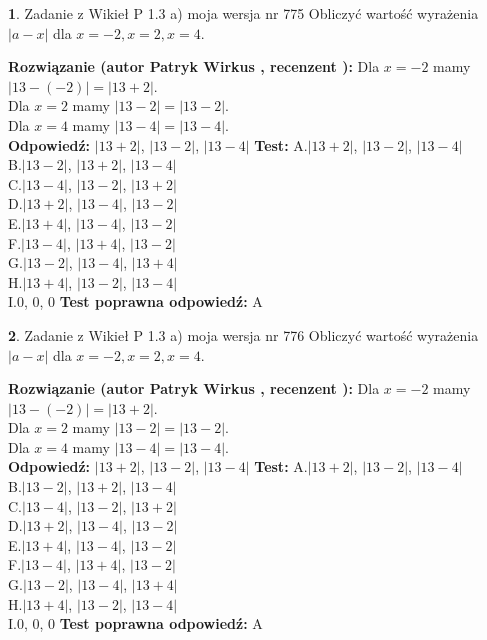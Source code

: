 \documentclass[12pt, a4paper]{article}
\theoremstyle{definition} %
\newtheorem{zad}{}
\newcommand{\zadStart}[1]{\begin{zad}#1\newline}
\newcommand{\zadStop}{\end{zad}}
\newcommand{\rozwStart}[2]{\noindent \textbf{Rozwiązanie (autor #1 , recenzent #2): }\newline}
\newcommand{\rozwStop}{\newline}
\newcommand{\odpStart}{\noindent \textbf{Odpowiedź:}\newline}
\newcommand{\odpStop}{\newline}
\newcommand{\testStart}{\noindent \textbf{Test:}\newline}
\newcommand{\testStop}{\newline}
\newcommand{\kluczStart}{\noindent \textbf{Test poprawna odpowiedź:}\newline}
\newcommand{\kluczStop}{\newline}
\begin{document}
\zadStart{Zadanie z Wikieł P 1.3 a) moja wersja nr 775}
Obliczyć wartość wyrażenia $|a - x|$ dla $x=-2,x=2,x=4$.
\zadStop
\rozwStart{Patryk Wirkus}{}
Dla $x = -2$ mamy $|13 - (-2)| = |13 + 2|$.\\
Dla $x = 2$ mamy $|13 - 2| = |13 - 2|$.\\
Dla $x = 4$ mamy $|13 - 4| = |13 - 4|$.\\
\rozwStop
\odpStart
$|13 + 2|$, $|13 - 2|$, $|13 - 4|$
\odpStop
\testStart
A.$|13 + 2|$, $|13 - 2|$, $|13 - 4|$\\
B.$|13 - 2|$, $|13 + 2|$, $|13 - 4|$\\
C.$|13 - 4|$, $|13 - 2|$, $|13 + 2|$\\
D.$|13 + 2|$, $|13 - 4|$, $|13 - 2|$\\
E.$|13 + 4|$, $|13 - 4|$, $|13 - 2|$\\
F.$|13 - 4|$, $|13 + 4|$, $|13 - 2|$\\
G.$|13 - 2|$, $|13 - 4|$, $|13 + 4|$\\
H.$|13 + 4|$, $|13 - 2|$, $|13 - 4|$\\
I.$0$, $0$, $0$
\testStop
\kluczStart
A
\kluczStop



\zadStart{Zadanie z Wikieł P 1.3 a) moja wersja nr 776}
Obliczyć wartość wyrażenia $|a - x|$ dla $x=-2,x=2,x=4$.
\zadStop
\rozwStart{Patryk Wirkus}{}
Dla $x = -2$ mamy $|13 - (-2)| = |13 + 2|$.\\
Dla $x = 2$ mamy $|13 - 2| = |13 - 2|$.\\
Dla $x = 4$ mamy $|13 - 4| = |13 - 4|$.\\
\rozwStop
\odpStart
$|13 + 2|$, $|13 - 2|$, $|13 - 4|$
\odpStop
\testStart
A.$|13 + 2|$, $|13 - 2|$, $|13 - 4|$\\
B.$|13 - 2|$, $|13 + 2|$, $|13 - 4|$\\
C.$|13 - 4|$, $|13 - 2|$, $|13 + 2|$\\
D.$|13 + 2|$, $|13 - 4|$, $|13 - 2|$\\
E.$|13 + 4|$, $|13 - 4|$, $|13 - 2|$\\
F.$|13 - 4|$, $|13 + 4|$, $|13 - 2|$\\
G.$|13 - 2|$, $|13 - 4|$, $|13 + 4|$\\
H.$|13 + 4|$, $|13 - 2|$, $|13 - 4|$\\
I.$0$, $0$, $0$
\testStop
\kluczStart
A
\kluczStop
\end{document}
